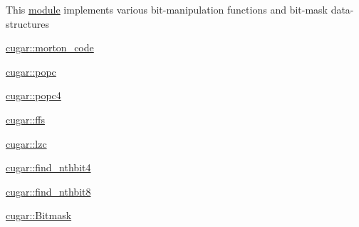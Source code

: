 This \hyperlink{group___bits_module}{module} implements various bit-\/manipulation functions and bit-\/mask data-\/structures


\begin{DoxyItemize}
\item \hyperlink{group___bits_module_ga6494ab687521f35e3e28dc1524d15218}{cugar\+::morton\+\_\+code}
\item \hyperlink{group___bits_module_ga88a87094ba5547f8896d8947adfdec58}{cugar\+::popc}
\item \hyperlink{group___bits_module_ga4bc7fb7acba5b770553c58bfae69f5af}{cugar\+::popc4}
\item \hyperlink{group___bits_module_ga68f09d26fa95c119a5263f856365db42}{cugar\+::ffs}
\item \hyperlink{group___bits_module_gad2be8d91a93a10a6a9601f4f89bf752b}{cugar\+::lzc}
\item \hyperlink{group___bits_module_ga7f02d582847e11ea8454216ad36dc77b}{cugar\+::find\+\_\+nthbit4}
\item \hyperlink{group___bits_module_ga38b135612da4fe8202152a56dc9b9508}{cugar\+::find\+\_\+nthbit8}
\item \hyperlink{structcugar_1_1_bitmask}{cugar\+::\+Bitmask} 
\end{DoxyItemize}